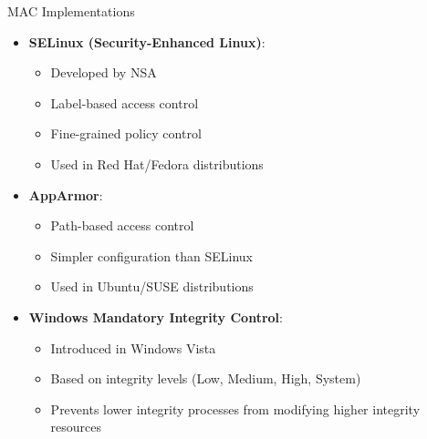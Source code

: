\begin{concept}{MAC Implementations}
\begin{itemize}
    \item \textbf{SELinux (Security-Enhanced Linux)}:
    \begin{itemize}
        \item Developed by NSA
        \item Label-based access control
        \item Fine-grained policy control
        \item Used in Red Hat/Fedora distributions
    \end{itemize}
    \item \textbf{AppArmor}:
    \begin{itemize}
        \item Path-based access control
        \item Simpler configuration than SELinux
        \item Used in Ubuntu/SUSE distributions
    \end{itemize}
    \item \textbf{Windows Mandatory Integrity Control}:
    \begin{itemize}
        \item Introduced in Windows Vista
        \item Based on integrity levels (Low, Medium, High, System)
        \item Prevents lower integrity processes from modifying higher integrity resources
    \end{itemize}
\end{itemize}
\end{concept}

\multend

